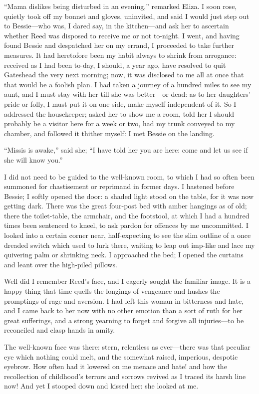 \enquote{Mama dislikes being disturbed in an evening,} remarked Eliza. 
I soon rose, quietly took off my bonnet and gloves, uninvited, and said
I would just step out to Bessie---who was, I dared say, in the
kitchen---and ask her to ascertain whether \Mrs{} Reed was disposed to
receive me or not to-night. I went, and having found Bessie and
despatched her on my errand, I proceeded to take further measures. It
had heretofore been my habit always to shrink from arrogance: received
as I had been to-day, I should, a year ago, have resolved to quit
Gateshead the very next morning; now, it was disclosed to me all at once
that that would be a foolish plan. I had taken a journey of a hundred
miles to see my aunt, and I must stay with her till she was better---or
dead: as to her daughters' pride or folly, I must put it on one side,
make myself independent of it. So I addressed the housekeeper; asked
her to show me a room, told her I should probably be a visitor here for
a week or two, had my trunk conveyed to my chamber, and followed it
thither myself: I met Bessie on the landing.

\enquote{Missis is awake,} said she; \enquote{I have told her you are
here: come and let us see if she will know you.}

I did not need to be guided to the well-known room, to which I had so
often been summoned for chastisement or reprimand in former days. I
hastened before Bessie; I softly opened the door: a shaded light stood
on the table, for it was now getting dark. There was the great
four-post bed with amber hangings as of old; there the toilet-table, the
armchair, and the footstool, at which I had a hundred times been
sentenced to kneel, to ask pardon for offences by me uncommitted. I
looked into a certain corner near, half-expecting to see the slim
outline of a once dreaded switch which used to lurk there, waiting to
leap out imp-like and lace my quivering palm or shrinking neck. I
approached the bed; I opened the curtains and leant over the high-piled
pillows.

Well did I remember \Mrs{} Reed's face, and I eagerly sought the familiar
image. It is a happy thing that time quells the longings of vengeance
and hushes the promptings of rage and aversion. I had left this woman
in bitterness and hate, and I came back to her now with no other emotion
than a sort of ruth for her great sufferings, and a strong yearning to
forget and forgive all injuries---to be reconciled and clasp hands in
amity.

The well-known face was there: stern, relentless as ever---there was
that peculiar eye which nothing could melt, and the somewhat raised,
imperious, despotic eyebrow. How often had it lowered on me menace and
hate! and how the recollection of childhood's terrors and sorrows
revived as I traced its harsh line now! And yet I stooped down and
kissed her: she looked at me.

